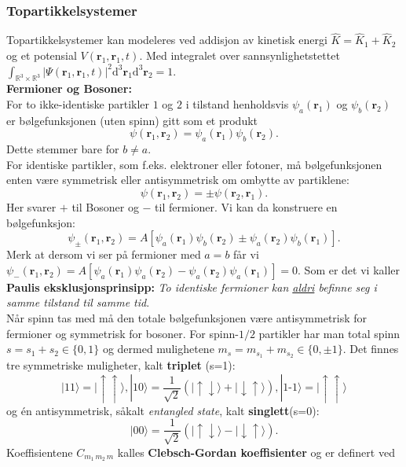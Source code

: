 \documentclass[a4paper, norsk, 8pt]{article}
\newcommand{\ket}[1] { |#1\rangle }
\begin{document}
\begin{multicols*}{3}
\subsubsection*{\scriptsize Topartikkelsystemer} 
Topartikkelsystemer kan modeleres ved addisjon av kinetisk energi $\hat{K}=\hat{K}_1+\hat{K}_2$ og et potensial $V(\mathbf{r}_1,\mathbf{r}_1,t)$. Med integralet over sannsynlighetstettet $\int_{\mathbb{R}^3\times \mathbb{R}^3}|\Psi(\mathbf{r}_1,\mathbf{r}_1,t)|^2\mbox{d}^3\mathbf{r}_1\mbox{d}^3\mathbf{r}_2=1$. \\
\textbf{Fermioner og Bosoner:}\\
For to ikke-identiske partikler $1$ og $2$ i tilstand henholdsvis $\psi_a(\mathbf{r}_1)$ og $\psi_b(\mathbf{r}_2)$ er bølgefunksjonen (uten spinn) gitt som et produkt \[\psi(\mathbf{r}_1,\mathbf{r}_2)=\psi_a(\mathbf{r}_1)\psi_b(\mathbf{r}_2).\] Dette stemmer bare for $b\neq a$. \\
For identiske partikler, som f.eks. elektroner eller fotoner, må bølgefunksjonen enten være symmetrisk eller antisymmetrisk om ombytte av partiklene: \[\psi(\mathbf{r}_1,\mathbf{r}_2)=\pm \psi(\mathbf{r}_2,\mathbf{r}_1).\] Her svarer $+$ til Bosoner og $-$ til fermioner. Vi kan da konstruere en bølgefunksjon:
\[ \psi_\pm(\mathbf{r}_1,\mathbf{r}_2)=A\left[\psi_a(\mathbf{r}_1)\psi_b(\mathbf{r}_2)\pm \psi_a(\mathbf{r}_2)\psi_b(\mathbf{r}_1)\right]. \]
Merk at dersom vi ser på fermioner med $a=b$ får vi $\psi_-(\mathbf{r}_1,\mathbf{r}_2)=A\left[\psi_a(\mathbf{r}_1)\psi_a(\mathbf{r}_2)-\psi_a(\mathbf{r}_2)\psi_a(\mathbf{r}_1)\right]=0$. Som er det vi kaller \\ 
\textbf{Paulis eksklusjonsprinsipp:} \textit{ To identiske fermioner kan \underline{aldri} befinne seg i samme tilstand til samme tid}.\\
Når spinn tas med må den totale bølgefunksjonen være antisymmetrisk for fermioner og symmetrisk for bosoner. For spinn-$1/2$ partikler har man total spinn $s=s_1+s_2\in\{0,1\}$ og dermed mulighetene $m_s=m_{s_1}+m_{s_2}\in\{0,\pm 1\}$. Det finnes tre symmetriske muligheter, kalt \textbf{triplet} (s=1):
\[\ket{1 1}=\ket{\uparrow \uparrow},\ket{1 0}=\frac{1}{\sqrt{2}}\left(\ket{\uparrow \downarrow}+\ket{\downarrow\uparrow}\right),\ket{1\mbox{-}1}=\ket{\uparrow \uparrow} \] 
og én antisymmetrisk, såkalt \textit{entangled state}, kalt \textbf{singlett}(s=0):
\[ \ket{00}=\frac{1}{\sqrt{2}}\left(\ket{\uparrow \downarrow}-\ket{\downarrow\uparrow}\right).\]
Koeffisientene $C_{m_1 \, m_2 \, m}$ kalles \textbf{Clebsch-Gordan koeffisienter} og er definert ved

\end{multicols*}
\end{document}
